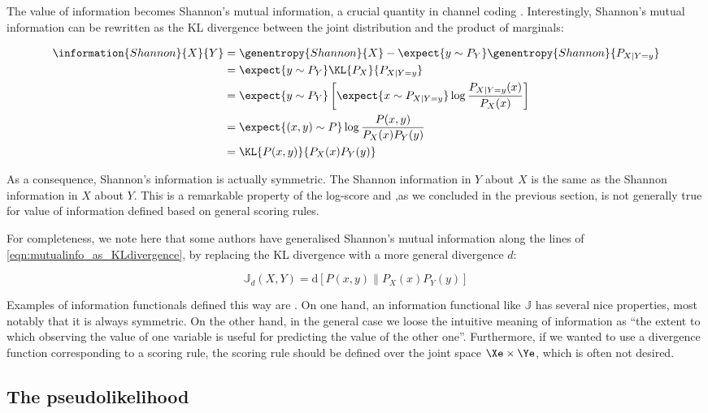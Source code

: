 The value of information becomes Shannon's mutual information, a crucial quantity in channel coding \cite{}. Interestingly, Shannon's mutual information can be rewritten as the KL divergence between the joint distribution and the product of marginals:

\begin{align}
	\information{Shannon}{X}{Y} &= \genentropy{Shannon}{X} - \expect{y \sim P_{Y}} \genentropy{Shannon}{P_{X\vert Y=y}}\\
		&= \expect{y \sim P_{Y}}\KL{P_X}{P_{X\vert Y=y}}\\
		&= \expect{y \sim P_{Y}}\left[\expect{x \sim P_{X\vert Y=y}} \log\frac{P_{X\vert Y=y}(x)}{P_X(x)} \right]\\
		&= \expect{(x,y) \sim P} \log \frac{P(x,y)}{P_{X}(x)P_{Y}(y)}\\
		&= \KL{P(x,y)}{P_{X}(x)P_{Y}(y)}\label{eqn:mutualinfo_as_KLdivergence}
\end{align}

As a consequence, Shannon's information is actually symmetric. The Shannon information in $Y$ about $X$ is the same as the Shannon information in $X$ about $Y$. This is a remarkable property of the log-score and ,as we concluded in the previous section, is not generally true for value of information defined based on general scoring rules.

For completeness, we note here that some authors have generalised Shannon's mutual information along the lines of \eqref{eqn:mutualinfo_as_KLdivergence}, by replacing the KL divergence with a more general divergence $d$:

\begin{equation}
	\mathbb{J}_{d}(X,Y) = \mbox{d}\left[ P(x,y) \middle\| P_{X}(x)P_{Y}(y) \right]
\end{equation}

Examples of information functionals defined this way are \cite{}.
On one hand, an information functional like $\mathbb{J}$ has several nice properties, most notably that it is always symmetric. On the other hand, in the general case we loose the intuitive meaning of information as ``the extent to which observing the value of one variable is useful for predicting the value of the other one''. Furthermore, if we wanted to use a divergence function corresponding to a scoring rule, the scoring rule should be defined over the joint space $\Xe\times\Ye$, which is often not desired.

\subsection{The pseudolikelihood}

